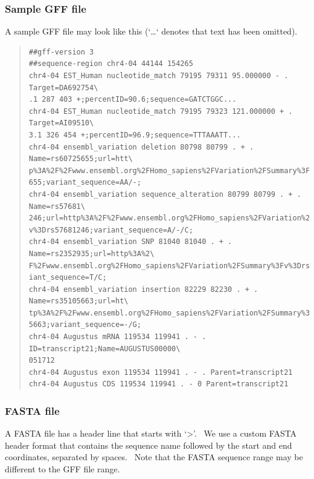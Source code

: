 \documentclass[letterpaper]{article}
\begin{document}
\bigskip

{\color[rgb]{0.30980393,0.5058824,0.7411765}\subsubsection[Sample GFF file]{Sample GFF file}}

{A sample GFF file may look like this
({\textquoteleft}{\dots}{\textquoteleft} denotes that text has been
omitted).}

\bigskip

\begin{quote}
\begin{verbatim}
##gff-version 3
##sequence-region chr4-04 44144 154265
chr4-04 EST_Human nucleotide_match 79195 79311 95.000000 - . Target=DA692754\
.1 287 403 +;percentID=90.6;sequence=GATCTGGC...
chr4-04 EST_Human nucleotide_match 79195 79323 121.000000 + . Target=AI09510\
3.1 326 454 +;percentID=96.9;sequence=TTTAAATT...
chr4-04 ensembl_variation deletion 80798 80799 . + . Name=rs60725655;url=htt\
p%3A%2F%2Fwww.ensembl.org%2FHomo_sapiens%2FVariation%2FSummary%3Fv%3Drs60725\
655;variant_sequence=AA/-;
chr4-04 ensembl_variation sequence_alteration 80799 80799 . + . Name=rs57681\
246;url=http%3A%2F%2Fwww.ensembl.org%2FHomo_sapiens%2FVariation%2FSummary%3F\
v%3Drs57681246;variant_sequence=A/-/C;
chr4-04 ensembl_variation SNP 81040 81040 . + . Name=rs2352935;url=http%3A%2\
F%2Fwww.ensembl.org%2FHomo_sapiens%2FVariation%2FSummary%3Fv%3Drs2352935;var\
iant_sequence=T/C;
chr4-04 ensembl_variation insertion 82229 82230 . + . Name=rs35105663;url=ht\
tp%3A%2F%2Fwww.ensembl.org%2FHomo_sapiens%2FVariation%2FSummary%3Fv%3Drs3510\
5663;variant_sequence=-/G;
chr4-04 Augustus mRNA 119534 119941 . - . ID=transcript21;Name=AUGUSTUS00000\
051712
chr4-04 Augustus exon 119534 119941 . - . Parent=transcript21
chr4-04 Augustus CDS 119534 119941 . - 0 Parent=transcript21
\end{verbatim}
\end{quote}

\bigskip

{\color[rgb]{0.30980393,0.5058824,0.7411765}\subsubsection[FASTA file]{FASTA file}}
\hypertarget{RefHeading1541056909880}{}{
A FASTA file has a header line that starts with
{\textquoteleft}{\textgreater}{\textquoteright}. \ We use a custom
FASTA header format that contains the sequence name followed by the
start and end coordinates, separated by spaces. \ Note that the FASTA
sequence range may be different to the GFF file range.}
\end{document}
